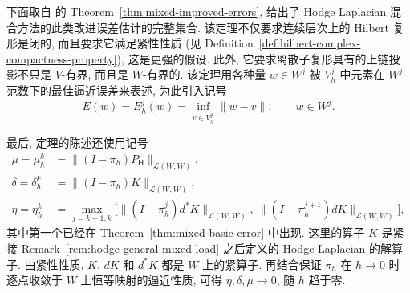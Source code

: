 {下面取自  的 Theorem~\ref{thm:mixed-improved-errors}, 给出了 Hodge Laplacian 混合方法的此类改进误差估计的完整集合. 该定理不仅要求连续层次上的 Hilbert 复形是闭的, 而且要求它满足紧性性质 (见 Definition~\ref{def:hilbert-complex-compactness-property}), 这是更强的假设. 此外, 它要求离散子复形具有的上链投影不只是 $V$-有界, 而且是 $W$-有界的. 该定理用各种量 $w\in W^j$ 被 $V_h^j$ 中元素在 $W^j$ 范数下的最佳逼近误差来表述, 为此引入记号}
\[
E(w)=E_h^j(w)=\inf_{v\in V_h^j}\|w-v\|,\qquad w\in W^j.
\]

{最后, 定理的陈述还使用记号}
\[
\begin{aligned}
\mu=\mu_h^k&=\|(I-\pi_h)P_{\mathsf H}\|_{\mathcal L(W,W)},\\
\delta=\delta_h^k&=\|(I-\pi_h)K\|_{\mathcal L(W,W)},\\
\eta=\eta_h^k&=\max_{j=k-1,k}\big[\|(I-\pi_h^j)d^*K\|_{\mathcal L(W,W)},\ \|(I-\pi_h^{j+1})dK\|_{\mathcal L(W,W)}\big],
\end{aligned}
\]
{其中第一个已经在 Theorem~\ref{thm:mixed-basic-error} 中出现. 这里的算子 $K$ 是紧接 Remark~\ref{rem:hodge-general-mixed-load} 之后定义的 Hodge Laplacian 的解算子. 由紧性性质, $K$, $dK$ 和 $d^*K$ 都是 $W$ 上的紧算子. 再结合保证 $\pi_h$ 在 $h\to0$ 时逐点收敛于 $W$ 上恒等映射的逼近性质, 可得 $\eta,\delta,\mu\to0$, 随 $h$ 趋于零.}


